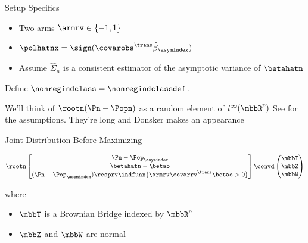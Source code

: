 \documentclass[aspectratio=169, professionalfonts]{beamer}
\begin{document}
\begin{frame}{Setup Specifics}
	\begin{itemize}
		\item	Two arms $\armrv \in \{-1, 1\}$
		      \vfill

		\item $\polhatnx = \sign(\covarobs^{\trans}\widehat{\beta}_{\asymindex})$
		      \vfill

		\item Assume $\widehat{\Sigma}_n$ is a consistent estimator of the asymptotic variance of $\betahatn$
	\end{itemize}
	\vfill \pause

	Define $\nonregindclass = \nonregindclassdef$.
	\vfill

	We'll think of $\rootn(\Pn - \Popn)$ as a random element of $l^{\infty}(\mbbR^p)$
	\footnotesize
	See  for the assumptions. They're long and
	Donsker makes an appearance
\end{frame}

\begin{frame}{Joint Distribution Before Maximizing}

	\begin{displaymath}
		\rootn \begin{bmatrix}\Pn - \Pop_{\asymindex} \\
			\betahatn - \betao      \\
			(\Pn - \Pop_{\asymindex})\resprv \indfunx{\armrv \covarrv^{\trans}\betao
				> 0}\end{bmatrix} \convd \begin{pmatrix} \mbbT \\ \mbbZ \\
			\mbbW\end{pmatrix}
	\end{displaymath}

	where

	\begin{itemize}
		\item $\mbbT$ is a Brownian Bridge indexed by $\mbbR^p$
		\item $\mbbZ$ and $\mbbW$ are normal
	\end{itemize}
\end{frame}
\end{document}
